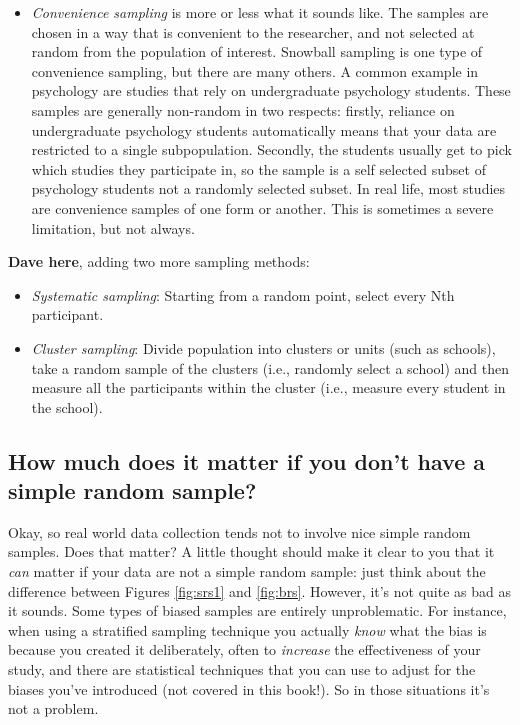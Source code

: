 \documentclass[
]{book}
\begin{document}
\begin{itemize}
\item
  \emph{Convenience sampling} is more or less what it sounds like. The samples are chosen in a way that is convenient to the researcher, and not selected at random from the population of interest. Snowball sampling is one type of convenience sampling, but there are many others. A common example in psychology are studies that rely on undergraduate psychology students. These samples are generally non-random in two respects: firstly, reliance on undergraduate psychology students automatically means that your data are restricted to a single subpopulation. Secondly, the students usually get to pick which studies they participate in, so the sample is a self selected subset of psychology students not a randomly selected subset. In real life, most studies are convenience samples of one form or another. This is sometimes a severe limitation, but not always.
\end{itemize}

\textbf{Dave here}, adding two more sampling methods:

\begin{itemize}
\item
  \emph{Systematic sampling}: Starting from a random point, select every Nth participant.
\item
  \emph{Cluster sampling}: Divide population into clusters or units (such as schools), take a random sample of the clusters (i.e., randomly select a school) and then measure all the participants within the cluster (i.e., measure every student in the school).
\end{itemize}

\hypertarget{how-much-does-it-matter-if-you-dont-have-a-simple-random-sample}{%
\subsection{How much does it matter if you don't have a simple random sample?}\label{how-much-does-it-matter-if-you-dont-have-a-simple-random-sample}}

Okay, so real world data collection tends not to involve nice simple random samples. Does that matter? A little thought should make it clear to you that it \emph{can} matter if your data are not a simple random sample: just think about the difference between Figures \ref{fig:srs1} and \ref{fig:brs}. However, it's not quite as bad as it sounds. Some types of biased samples are entirely unproblematic. For instance, when using a stratified sampling technique you actually \emph{know} what the bias is because you created it deliberately, often to \emph{increase} the effectiveness of your study, and there are statistical techniques that you can use to adjust for the biases you've introduced (not covered in this book!). So in those situations it's not a problem.
\end{document}
